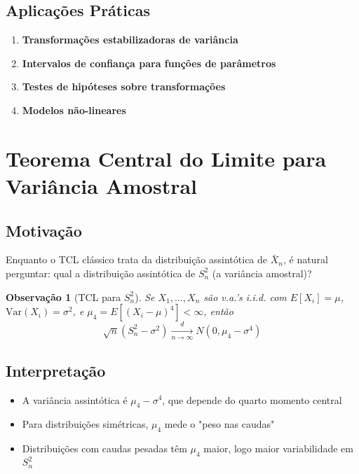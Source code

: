 \documentclass[12pt,a4paper]{article}
\theoremstyle{definition}
\theoremstyle{plain}
\newtheorem{observacao}{Observação}[section]
\begin{document}
\subsection{Aplicações Práticas}

\begin{enumerate}
    \item \textbf{Transformações estabilizadoras de variância}
    \item \textbf{Intervalos de confiança para funções de parâmetros}
    \item \textbf{Testes de hipóteses sobre transformações}
    \item \textbf{Modelos não-lineares}
\end{enumerate}

\section{Teorema Central do Limite para Variância Amostral}

\subsection{Motivação}

Enquanto o TCL clássico trata da distribuição assintótica de $\bar{X}_n$, é natural perguntar: qual a distribuição assintótica de $S_n^2$ (a variância amostral)?

\begin{observacao}[TCL para $S_n^2$]
Se $X_1, \ldots, X_n$ são v.a.'s i.i.d. com $E[X_i] = \mu$, $\text{Var}(X_i) = \sigma^2$, e $\mu_4 = E[(X_i - \mu)^4] < \infty$, então
\[
\sqrt{n}(S_n^2 - \sigma^2) \xrightarrow[n \to \infty]{d} N(0, \mu_4 - \sigma^4)
\]
\end{observacao}

\subsection{Interpretação}

\begin{itemize}
    \item A variância assintótica é $\mu_4 - \sigma^4$, que depende do quarto momento central
    \item Para distribuições simétricas, $\mu_4$ mede o "peso nas caudas"
    \item Distribuições com caudas pesadas têm $\mu_4$ maior, logo maior variabilidade em $S_n^2$
\end{itemize}
\end{document}
